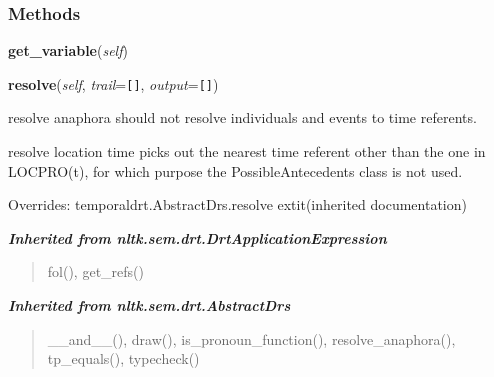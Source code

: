   \subsubsection{Methods}

    \label{temporaldrt:DrtPresuppositionApplicationExpression:get_variable}

    \vspace{0.5ex}

\hspace{.8\funcindent}\begin{boxedminipage}{\funcwidth}

    \raggedright \textbf{get\_variable}(\textit{self})

\setlength{\parskip}{2ex}
\setlength{\parskip}{1ex}
    \end{boxedminipage}

    \vspace{0.5ex}

\hspace{.8\funcindent}\begin{boxedminipage}{\funcwidth}

    \raggedright \textbf{resolve}(\textit{self}, \textit{trail}={\tt \texttt{[}\texttt{]}}, \textit{output}={\tt \texttt{[}\texttt{]}})

\setlength{\parskip}{2ex}
    resolve anaphora should not resolve individuals and events to time 
    referents.

    resolve location time picks out the nearest time referent other than 
    the one in LOCPRO(t), for which purpose the PossibleAntecedents class 
    is not used.

\setlength{\parskip}{1ex}
      Overrides: temporaldrt.AbstractDrs.resolve 	extit{(inherited documentation)}

    \end{boxedminipage}


\large{\textbf{\textit{Inherited from nltk.sem.drt.DrtApplicationExpression}}}

\begin{quote}
fol(), get\_refs()
\end{quote}

\large{\textbf{\textit{Inherited from nltk.sem.drt.AbstractDrs}}}

\begin{quote}
\_\_and\_\_(), draw(), is\_pronoun\_function(), resolve\_anaphora(), tp\_equals(), typecheck()
\end{quote}

